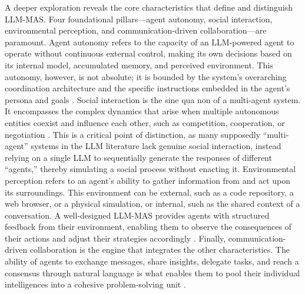 \documentclass[11pt]{article}
\begin{document}
A deeper exploration reveals the core characteristics that define and distinguish LLM-MAS. Four foundational pillars---agent autonomy, social interaction, environmental perception, and communication-driven collaboration---are paramount. Agent autonomy refers to the capacity of an LLM-powered agent to operate without continuous external control, making its own decisions based on its internal model, accumulated memory, and perceived environment. This autonomy, however, is not absolute; it is bounded by the system's overarching coordination architecture and the specific instructions embedded in the agent's persona and goals \cite{ref2}. Social interaction is the sine qua non of a multi-agent system. It encompasses the complex dynamics that arise when multiple autonomous entities coexist and influence each other, such as competition, cooperation, or negotiation \cite{ref6}. This is a critical point of distinction, as many supposedly ``multi-agent'' systems in the LLM literature lack genuine social interaction, instead relying on a single LLM to sequentially generate the responses of different ``agents,'' thereby simulating a social process without enacting it. Environmental perception refers to an agent's ability to gather information from and act upon its surroundings. This environment can be external, such as a code repository, a web browser, or a physical simulation, or internal, such as the shared context of a conversation. A well-designed LLM-MAS provides agents with structured feedback from their environment, enabling them to observe the consequences of their actions and adjust their strategies accordingly \cite{ref3}. Finally, communication-driven collaboration is the engine that integrates the other characteristics. The ability of agents to exchange messages, share insights, delegate tasks, and reach a consensus through natural language is what enables them to pool their individual intelligences into a cohesive problem-solving unit \cite{ref7}.
\end{document}
